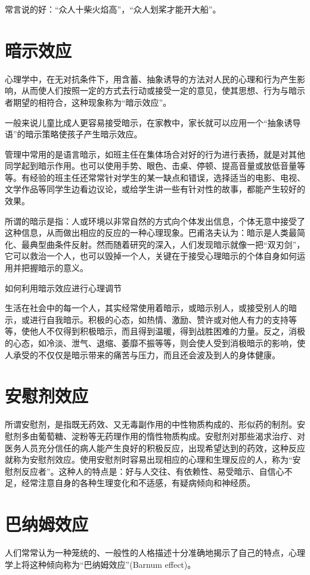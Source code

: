 \documentclass[11pt]{ctexart}
\begin{document}
常言说的好：“众人十柴火焰高”，“众人划桨才能开大船”。
\section{暗示效应}
\label{sec-4}


心理学中，在无对抗条件下，用含蓄、抽象诱导的方法对人民的心理和行为产生影响，从而使人们按照一定的方式去行动或接受一定的意见，使其思想、行为与暗示者期望的相符合，这种现象称为“暗示效应”。

一般来说儿童比成人更容易接受暗示，在家教中，家长就可以应用一个“抽象诱导语”的暗示策略使孩子产生暗示效应。

管理中常用的是语言暗示，如班主任在集体场合对好的行为进行表扬，就是对其他同学起到暗示作用。也可以使用手势、眼色、击桌、停顿、提高音量或放低音量等等。有经验的班主任还常常针对学生的某一缺点和错误，选择适当的电影、电视、文学作品等同学生边看边议论，或给学生讲一些有针对性的故事，都能产生较好的效果。

所谓的暗示是指：人或环境以非常自然的方式向个体发出信息，个体无意中接受了这种信息，从而做出相应的反应的一种心理现象。巴甫洛夫认为：暗示是人类最简化、最典型曲条件反射。然而随着研究的深入，人们发现暗示就像一把“双刃剑”，它可以救治一个人，也可以毁掉一个人，关键在于接受心理暗示的个体自身如何运用并把握暗示的意义。

如何利用暗示效应进行心理调节

生活在社会中的每一个人，其实经常使用着暗示，或暗示别人，或接受别人的暗示，或进行自我暗示。积极的心态，如热情、激励、赞许或对他人有力的支持等等，使他人不仅得到积极暗示，而且得到温暖，得到战胜困难的力量。反之，消极的心态，如冷淡、泄气、退缩、萎靡不振等等，则会使人受到消极暗示的影响，使人承受的不仅仅是暗示带来的痛苦与压力，而且还会波及到人的身体健康。
\section{安慰剂效应}
\label{sec-5}


所谓安慰剂，是指既无药效、又无毒副作用的中性物质构成的、形似药的制剂。安慰剂多由葡萄糖、淀粉等无药理作用的惰性物质构成。安慰剂对那些渴求治疗、对医务人员充分信任的病人能产生良好的积极反应，出现希望达到的药效，这种反应就称为安慰剂效应。使用安慰剂时容易出现相应的心理和生理反应的人，称为“安慰剂反应者”。这种人的特点是：好与人交往、有依赖性、易受暗示、自信心不足，经常注意自身的各种生理变化和不适感，有疑病倾向和神经质。
\section{巴纳姆效应}
\label{sec-6}
人们常常认为一种笼统的、一般性的人格描述十分准确地揭示了自己的特点，心理学上将这种倾向称为“巴纳姆效应”(Barnum effect)。
\end{document}
